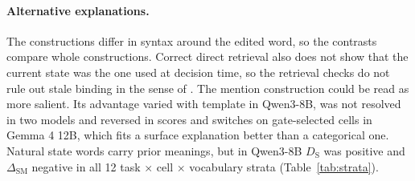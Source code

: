 \paragraph{Alternative explanations.} The constructions differ in syntax around the edited word, so the
contrasts compare whole constructions. Correct direct retrieval also does not show that the current state
was the one used at decision time, so the retrieval checks do not rule out stale binding in the sense of
\citet{guo2026context}. The mention construction could be read as more salient. Its
advantage varied with template in Qwen3-8B, was not resolved in two models and reversed in scores and switches on gate-selected
cells in Gemma 4 12B, which fits a surface
explanation better than a categorical one. Natural state words carry prior meanings, but in Qwen3-8B $D_{\mathrm{S}}$ was positive and
$\Delta_{\mathrm{SM}}$ negative in all 12 task $\times$ cell $\times$ vocabulary strata (Table~\ref{tab:strata}).
